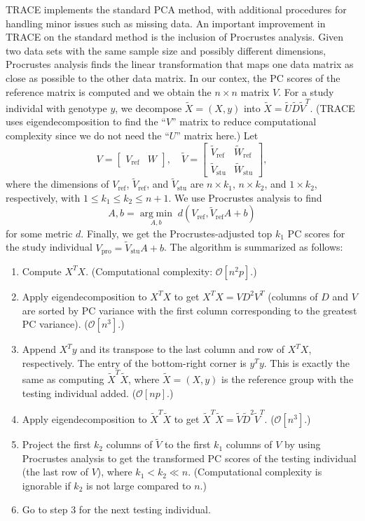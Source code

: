 \documentclass{article}[12pt]
\newcommand{\bO}{\mathcal{O}}
\newcommand{\argmin}[1]{\underset{#1}{\operatorname{arg\;min}}\;}
\begin{document}
TRACE implements the standard PCA method, with additional procedures for handling minor issues such as missing data.
An important improvement in TRACE on the standard method is the inclusion of Procrustes analysis.
Given two data sets with the same sample size and possibly different dimensions,
Procrustes analysis finds the linear transformation that maps one data matrix as close as possible to the other data matrix.
In our contex, the PC scores of the reference matrix is computed and we obtain the $n \times n$ matrix $V$.
For a study individal with genotype $y$, we decompose $\tilde{X} = (X, y)$ into $\tilde{X} = \tilde{U}\tilde{D}\tilde{V}^T$.
(TRACE uses eigendecomposition to find the ``$V$'' matrix to reduce computational complexity since we do not need the ``$U$'' matrix here.)
Let
\[
  V =
  \begin{bmatrix}
    V_{\text{ref}} & W
  \end{bmatrix},
  \quad
  \tilde{V} =
  \begin{bmatrix}
    \tilde{V}_{\text{ref}} & \tilde{W}_\text{ref} \\
    \tilde{V}_\text{stu} & \tilde{W}_\text{stu}
  \end{bmatrix},
\]
where the dimensions of $V_\text{ref}$, $\tilde{V}_\text{ref}$, and $\tilde{V}_\text{stu}$ are $n \times k_1$, $n \times k_2$, and $1 \times k_2$, respectively, with $ 1 \leq k_1 \leq k_2 \leq n+1$. 
We use Procrustes analysis to find
\[
  A, b = \argmin{A, b} d(V_\text{ref}, \tilde{V}_{\text{ref}}A+b)
\]
for some metric $d$.
Finally, we get the Procrustes-adjusted top $k_1$ PC scores for the study individual $V_\text{pro} = \tilde{V}_\text{stu} A + b$.
The algorithm is summarized as follows:
\begin{enumerate}
\item Compute $X^T X$.
  (Computational complexity: $\bO[n^2p]$.)  
\item Apply eigendecomposition to $X^T X$ to get $X^T X = V D^2 V^T$ (columns of $D$ and $V$ are sorted by PC variance with the first column corresponding to the greatest PC variance).
  ($\bO[n^3]$.)
\item Append $X^T y$ and its transpose to the last column and row of $X^T X$, respectively.
  The entry of the bottom-right corner is $y^T y$.
  This is exactly the same as computing $\tilde{X}^T \tilde{X}$,
  where $\tilde{X} = (X, y)$ is the reference group with the testing individual added.
  ($\bO[np]$.)
\item Apply eigendecomposition to $\tilde{X}^T \tilde{X}$ to get $\tilde{X}^T \tilde{X} = \tilde{V} \tilde{D}^2 \tilde{V}^T$.
  ($\bO[n^3]$.)
\item Project the first $k_2$ columns of $\tilde{V}$ to the first $k_1$ columns of $V$ by using Procrustes analysis to get the transformed PC scores of the testing individual (the last row of $V$),
  where $k_1 < k_2 \ll n$.
  (Computational complexity is ignorable if $k_2$ is not large compared to $n$.)
  \item Go to step 3 for the next testing individual.
\end{enumerate}
\end{document}

